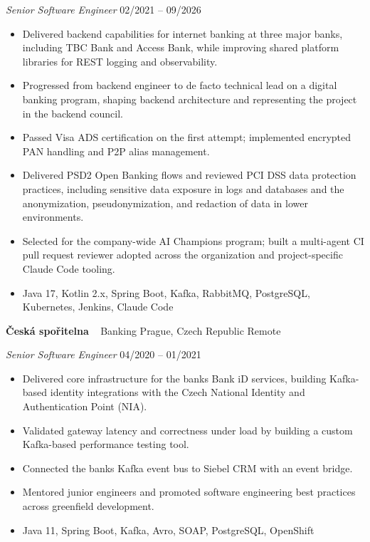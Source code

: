 \documentclass[10pt]{article}
\newcommand{\md}{\textperiodcentered}
\newcommand{\ap}{\textquotesingle}
\newcommand{\companyentry}[3]{%
\textbf{#1}%
\if\relax\detokenize{#2}\relax\else\ \md{} #2\fi%
\hfill {\footnotesize #3}%
}
\newcommand{\roleentry}[2]{%
\textit{#1} \hfill #2%
}
\begin{document}
\begin{minipage}[t]{0.4992\textwidth}
\roleentry{Senior Software Engineer}{02/2021 -- 09/2026}
\begin{itemize}[noitemsep,leftmargin=3.5mm,rightmargin=0mm,topsep=3pt]
  \item Delivered backend capabilities for internet banking at three major banks, including TBC Bank and Access Bank,
  while improving shared platform libraries for REST logging and observability.
  \item Progressed from backend engineer to de facto technical lead on a digital banking program, shaping backend
  architecture and representing the project in the backend council.
  \item Passed Visa ADS certification on the first attempt; implemented encrypted PAN handling and P2P alias management.
  \item Delivered PSD2 Open Banking flows and reviewed PCI DSS data protection practices, including sensitive data
  exposure in logs and databases and the anonymization, pseudonymization, and redaction of data in lower environments.
  \item Selected for the company-wide AI Champions program; built a multi-agent CI pull request reviewer adopted across
  the organization and project-specific Claude Code tooling.
  \item Java 17, Kotlin 2.x, Spring Boot, Kafka, RabbitMQ, PostgreSQL, Kubernetes, Jenkins, Claude Code
\end{itemize}

\smallskip

\companyentry{Česká spořitelna}{Banking}{Prague, Czech Republic \md{} Remote}\par\vspace{1pt}

\roleentry{Senior Software Engineer}{04/2020 -- 01/2021}
\begin{itemize}[noitemsep,leftmargin=3.5mm,rightmargin=0mm,topsep=3pt]
  \item Delivered core infrastructure for the bank\ap s Bank iD services, building Kafka-based identity integrations
  with the Czech National Identity and Authentication Point (NIA).
  \item Validated gateway latency and correctness under load by building a custom Kafka-based performance testing tool.
  \item Connected the bank\ap s Kafka event bus to Siebel CRM with an event bridge.
  \item Mentored junior engineers and promoted software engineering best practices across greenfield development.
  \item Java 11, Spring Boot, Kafka, Avro, SOAP, PostgreSQL, OpenShift
\end{itemize}


\end{minipage}
\end{document}
